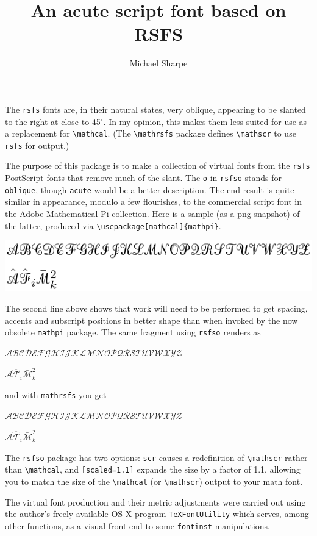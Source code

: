 \documentclass[11pt]{amsart}
\title{An acute script font based on RSFS}
\author{Michael Sharpe}
\begin{document}
\maketitle
The {\tt rsfs} fonts are, in their natural states, very oblique, appearing to be slanted to the right at close to 45$^\circ$. In my opinion, this makes them less suited for use as a replacement for \verb|\mathcal|. (The \verb|\mathrsfs| package defines \verb|\mathscr| to use {\tt rsfs} for output.)

The purpose of this package is to make a collection of virtual fonts from the {\tt rsfs} PostScript fonts that remove much of the slant. The {\tt o} in {\tt rsfso} stands for {\tt oblique}, though {\tt acute} would be a better description.  The end result is quite similar in appearance, modulo a few flourishes, to the commercial script font in the Adobe Mathematical Pi collection. Here is a sample (as a png snapshot) of the latter, produced via \verb|\usepackage[mathcal]{mathpi}|.

\includegraphics{mh2scr0}

The second line above shows that work will need to be performed to get spacing, accents and subscript positions in better shape than when invoked by the now obsolete {\tt mathpi} package. The same fragment using {\tt rsfso} renders as

$\mathcal{ABCDEFGHIJKLMNOPQRSTUVWXYZ}$

$\mathcal{\hat{A}}\mathcal{\hat{F}}_i\mathcal{\bar{M}}^2_k$

and with {\tt mathrsfs} you get

$\mathscr{ABCDEFGHIJKLMNOPQRSTUVWXYZ}$

$\mathscr{\hat{A}}\mathscr{\hat{F}}_i\mathscr{\bar{M}}^2_k$

The {\tt rsfso} package has two options: {\tt scr} causes a redefinition of \verb|\mathscr| rather than \verb|\mathcal|, and {\tt [scaled=1.1]} expands the size by a factor of 1.1, allowing you to match the size of the \verb|\mathcal| (or \verb|\mathscr|) output to your math font.

The virtual font production and their metric adjustments were carried out using the author's freely available OS X program {\tt TeXFontUtility} which serves, among other functions, as a visual front-end to some {\tt fontinst} manipulations.
\end{document}

